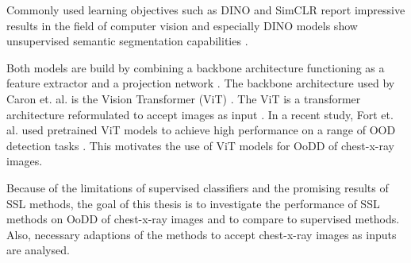 Commonly used learning objectives such as DINO \citep{Caron2021} and SimCLR \citep{Chen2020} report impressive results in the field of computer vision and especially DINO models show unsupervised semantic segmentation capabilities \citep{Caron2021}.
\par
Both models are build by combining a backbone architecture functioning as a feature extractor and a projection network \citep{Caron2021,Chen2020}. 
The backbone architecture used by Caron et. al. is the Vision Transformer (ViT) \citep{Caron2021}.
The ViT is a transformer architecture \citep{Vaswani2017} reformulated to accept images as input \citep{Dosovitskiy2020}.
In a recent study, Fort et. al. used pretrained ViT models to achieve high performance on a range of OOD detection tasks \citep{Fort2021}.
This motivates the use of ViT models for OoDD of chest-x-ray images.
\par
Because of the limitations of supervised classifiers and the promising results of SSL methods, the goal of this thesis is to investigate the performance of SSL methods on OoDD of chest-x-ray images and to compare to supervised methods.
Also, necessary adaptions of the methods to accept chest-x-ray images as inputs are analysed. 